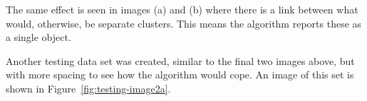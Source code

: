 The same effect is seen in images (a) and (b) where there is a link between
what would, otherwise, be separate clusters. This means the algorithm reports
these as a single object.

Another testing data set was created, similar to the final two images above,
but with more spacing to see how the algorithm would cope. An image of this set
is shown in Figure~\ref{fig:testing-image2a}.


